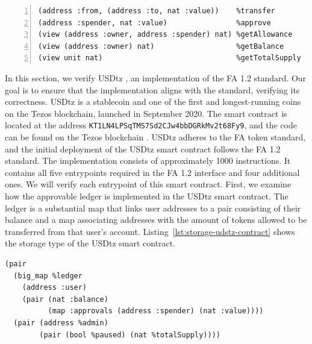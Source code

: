 \documentclass[a4paper,USenglish,cleveref, autoref,anonymous]{lipics-v2021}
\begin{document}
\begin{lstlisting}[float=tp,captionpos=b,caption={FA 1.2 interface},label={lst:fa12-interface},numbers=left]
(address :from, (address :to, nat :value))    %transfer
(address :spender, nat :value)                %approve
(view (address :owner, address :spender) nat) %getAllowance
(view (address :owner) nat)                   %getBalance
(view unit nat)                               %getTotalSupply
\end{lstlisting}

In this section, we verify USDtz \cite{usdtzimplemetation}, an
implementation of the FA 1.2 standard. Our goal is to ensure that the
implementation aligns with the standard, verifying its
correctness. USDtz is a stablecoin and one of the first and
longest-running coins on the Tezos blockchain, launched in September
2020. The smart contract is located at the address
\texttt{KT1LN4LPSqTMS7Sd2CJw4bbDGRkMv2t68Fy9}, and the code can be
found on the Tezos blockchain \cite{tzstatsusdtz}. USDtz adheres to
the FA token standard, and the initial deployment of the USDtz smart
contract follows the FA 1.2 standard. 
The implementation consists of approximately 1000 instructions. It
contains all five entrypoints required in the FA 1.2 interface and
four additional ones.  We will verify each entrypoint of this smart
contract. First, we examine how the approvable ledger is implemented
in the USDtz smart contract. The ledger is a substantial map that
links user addresses to a pair consisting of their balance and a map
associating addresses with the amount of tokens allowed to be
transferred from that user's
account. Listing~\ref{lst:storage-udstz-contract} shows the storage type of the
USDtz smart contract.  

\begin{lstlisting}[float=tp,captionpos=b,caption={Storage of the USDtz smart contract},label={lst:storage-udstz-contract}]
(pair
  (big_map %ledger
    (address :user)
    (pair (nat :balance)
          (map :approvals (address :spender) (nat :value))))
  (pair (address %admin)
        (pair (bool %paused) (nat %totalSupply))))
\end{lstlisting}
\end{document}
